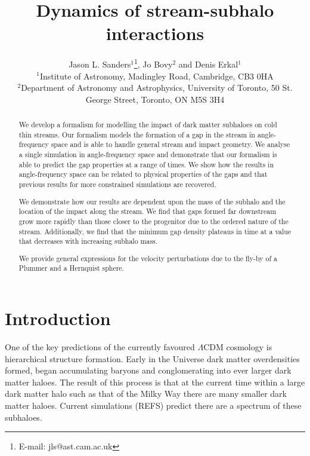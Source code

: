 \documentclass[useAMS,usenatbib,fleqn,a4paper]{mn2e}
\title{Dynamics of stream-subhalo interactions}
\author[J. L. Sanders, J. Bovy and D. Erkal]{Jason L. Sanders$^1$\thanks{E-mail: jls@ast.cam.ac.uk}, Jo Bovy$^2$ and Denis Erkal$^1$\\
$^1$Institute of Astronomy, Madingley Road, Cambridge, CB3 0HA\\
$^2$Department of Astronomy and Astrophysics, University of Toronto, 50 St. George Street, Toronto, ON M5S 3H4}
\begin{document}
\maketitle
\label{firstpage}
\begin{abstract}
We develop a formalism for modelling the impact of dark matter subhaloes on cold thin streams. Our formalism models the formation of a gap in the stream in angle-frequency space and is able to handle general stream and impact geometry. We analyse a single simulation in angle-frequency space and demonstrate that our formalism is able to predict the gap properties at a range of times. We show how the results in angle-frequency space can be related to physical properties of the gaps and that previous results for more constrained simulations are recovered.

We demonstrate how our results are dependent upon the mass of the subhalo and the location of the impact along the stream. We find that gaps formed far downstream grow more rapidly than those closer to the progenitor due to the ordered nature of the stream. Additionally, we find that the minimum gap density plateaus in time at a value that decreases with increasing subhalo mass.

We provide general expressions for the velocity perturbations due to the fly-by of a Plummer and a Hernquist sphere.
\end{abstract}

\begin{keywords}
\end{keywords}

\section{Introduction}

One of the key predictions of the currently favoured $\Lambda$CDM cosmology is hierarchical structure formation. Early in the Universe dark matter overdensities formed, began accumulating baryons and conglomerating into ever larger dark matter haloes. The result of this process is that at the current time within a large dark matter halo such as that of the Milky Way there are many smaller dark matter haloes. Current simulations (REFS) predict there are a spectrum of these subhaloes.
\end{document}
